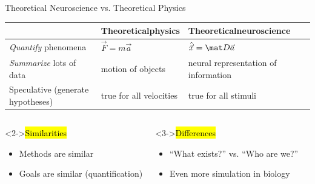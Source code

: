 \documentclass[handout,aspectratio=169]{beamer}
\begin{document}
\begin{frame}{Theoretical Neuroscience vs. Theoretical Physics}

\begin{table}[h]
	\centering
	\begin{tabular}{p{4cm} p{4cm} p{4cm}}
		\toprule
		&
		\textbf{Theoretical\newline physics} & \textbf{Theoretical\newline neuroscience} \\
		\midrule
		\raggedleft\emph{Quantify} phenomena & $\vec{F} = m \vec{a}$ & $\hat{\vec x} = \mat D \vec a$ \\
		\midrule
		\raggedleft \emph{Summarize} lots of data & motion of objects & neural representation of information \\
		\midrule
		\raggedleft Speculative (generate hypotheses) & true for all velocities & true for all stimuli \\
		\bottomrule
	\end{tabular}
	\label{tbl:physics_vs_theoretical_neuroscience}
\end{table}

\begin{columns}[T]
	\begin{block}<2->{\hl{Similarities}}
		\begin{itemize}
			\item Methods are similar
			\item Goals are similar (quantification)
		\end{itemize}
	\end{block}
	\begin{block}<3->{\hl{Differences}}
		\begin{itemize}
			\item \enquote{What exists?} vs. \enquote{Who are we?}
			\item Even more simulation in biology
		\end{itemize}
	\end{block}
\end{columns}
\end{frame}
\end{document}
